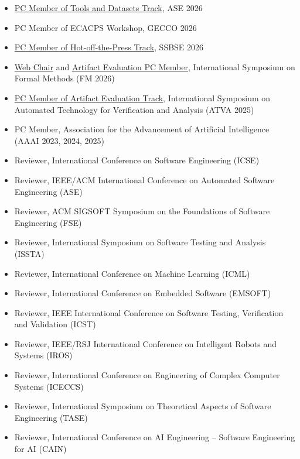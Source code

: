\documentclass[11pt,a4paper]{moderncv}        %
\begin{document}
\begin{itemize}
    \item \href{https://conf.researchr.org/track/ase-2026/ase-2026-tools-and-data-sets}{PC Member of Tools and Datasets Track}, ASE 2026
    \item PC Member of ECACPS Workshop, GECCO 2026
    \item \href{https://conf.researchr.org/track/ssbse-2026/ssbse-2026-hot-off-the-press-track}{PC Member of Hot-off-the-Press Track}, SSBSE 2026
    \item \href{https://conf.researchr.org/committee/fm-2026/fm-2026-organizing-committee}{Web Chair} and \href{https://conf.researchr.org/track/fm-2026/fm-2026-artifact-evaluation}{Artifact Evaluation PC Member}, International Symposium on Formal Methods (FM 2026)
    \item \href{https://conf.researchr.org/committee/atva-2025/atva-2025-artifact-evaluation-committee}{PC Member of Artifact Evaluation Track}, International Symposium on Automated Technology for Verification and Analysis (ATVA 2025)
    \item PC Member, Association for the Advancement of Artificial Intelligence (AAAI 2023, 2024, 2025)
    \item Reviewer, International Conference on Software Engineering (ICSE)
    \item Reviewer, IEEE/ACM International Conference on Automated Software Engineering (ASE)
    \item Reviewer, ACM SIGSOFT Symposium on the Foundations of Software Engineering (FSE)
    \item Reviewer, International Symposium on Software Testing and Analysis (ISSTA)
    \item Reviewer, International Conference on Machine Learning (ICML)
    \item Reviewer, International Conference on Embedded Software (EMSOFT)
    \item Reviewer, IEEE International Conference on Software Testing, Verification and Validation (ICST)
    \item Reviewer, IEEE/RSJ International Conference on Intelligent Robots and Systems (IROS)    
    \item Reviewer, International Conference on Engineering of Complex Computer Systems (ICECCS)
    \item Reviewer, International Symposium on Theoretical Aspects of Software Engineering (TASE)
    \item Reviewer, International Conference on AI Engineering – Software Engineering for AI (CAIN)
\end{itemize}
\end{document}
